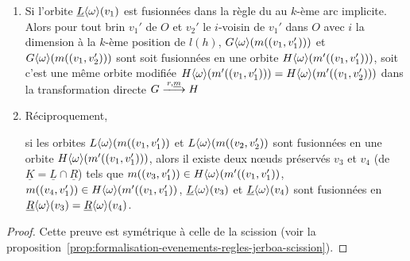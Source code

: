 \begin{proposition}
\begin{enumerate}
		\item Si l'orbite $\underline{L}\langle\omega\rangle(v_1)$ est fusionnées dans la règle
		      du au $k$-ème arc implicite. Alors pour tout brin $v_1'$ de $O$ et
		      $v_2'$ le $i$-voisin de $v_1'$ dans $O$ avec $i$ la dimension à la
		      $k$-ème position de $l(h)$, $G\langle\omega\rangle(m((v_1,v_1')))$ et
		      $G\langle\omega\rangle(m((v_1,v_2')))$ sont soit fusionnées en une orbite
		      $H\langle\omega\rangle(m'((v_1,v_1')))$, soit c'est une même orbite modifiée
		      $H\langle\omega\rangle(m'((v_1,v_1'))) = H\langle\omega\rangle(m'((v_1,v_2')))$ dans la
		      transformation directe $G \xlongrightarrow{r,\underline{m}} H$
		\item Réciproquement,

		      si les orbites $L\langle\omega\rangle(m((v_1, v'_1))$ et
		      $L\langle\omega\rangle(m((v_2, v'_2))$ sont fusionnées en une orbite
		      $H\langle\omega\rangle(m'((v_1, v'_1)))$, alors il existe deux n\oe uds préservés
		      $v_3$ et $v_4$ (de $\underline{K} = \underline{L} \cap \underline{R}$)
		      tels que $m((v_3, v'_1)) \in H\langle\omega\rangle(m'((v_1, v'_1))$,
		      $m((v_4, v'_1)) \in H\langle\omega\rangle(m'((v_1, v'_1))$,
		      $\underline{L}\langle\omega\rangle(v_3)$ et $\underline{L}\langle\omega\rangle(v_4)$ sont
		      fusionnées en
		      $\underline{R}\langle\omega\rangle(v_3) = \underline{R}\langle\omega\rangle(v_4) $. %
	\end{enumerate}
\end{proposition}

\begin{proof}
	Cette preuve est symétrique à celle de la scission (voir la proposition~\ref{prop:formalisation-evenements-regles-jerboa-scission}). %
\end{proof}


